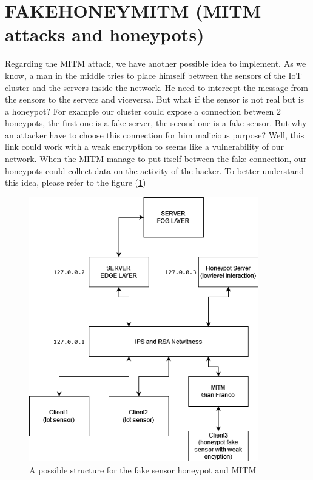\section{FAKEHONEYMITM (MITM attacks and honeypots)}
Regarding the MITM attack, we have another possible idea to implement. As we know, a man in the middle tries to place himself between the sensors of the IoT cluster and the servers inside the network. He need to intercept the message from the sensors to the servers and viceversa. But what if the sensor is not real but is a honeypot? For example our cluster could expose a connection between 2 honeypots, the first one is a fake server, the second one is a fake sensor. But why an attacker have to choose this connection for him malicious purpose? Well, this link could work with a weak encryption to seems like a vulnerability of our network. When the MITM manage to put itself between the fake connection, our honeypots could collect data on the activity of the hacker. To better understand this idea, please refer to the figure (\textcolor{blue}{\ref{fig:MITMFakeSensor}})

\begin{figure}[h!]
  \centering
  \includegraphics[width = 10cm]{images/MITMFakeSensor.drawio.png}
  \caption{A possible structure for the fake sensor honeypot and MITM}
  \label{fig:MITMFakeSensor}
\end{figure}
\FloatBarrier


